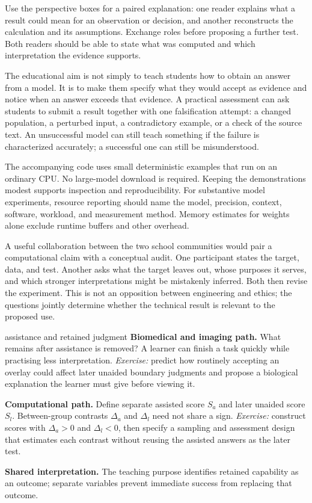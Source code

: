 \documentclass[11pt,a4paper]{article}
\begin{document}
Use the perspective boxes for a paired explanation: one reader explains what a result could mean for an observation or decision, and another reconstructs the calculation and its assumptions. Exchange roles before proposing a further test. Both readers should be able to state what was computed and which interpretation the evidence supports.

The educational aim is not simply to teach students how to obtain an answer from a model. It is to make them specify what they would accept as evidence and notice when an answer exceeds that evidence. A practical assessment can ask students to submit a result together with one falsification attempt: a changed population, a perturbed input, a contradictory example, or a check of the source text. An unsuccessful model can still teach something if the failure is characterized accurately; a successful one can still be misunderstood.

The accompanying code uses small deterministic examples that run on an ordinary CPU. No large-model download is required. Keeping the demonstrations modest supports inspection and reproducibility. For substantive model experiments, resource reporting should name the model, precision, context, software, workload, and measurement method. Memory estimates for weights alone exclude runtime buffers and other overhead.

A useful collaboration between the two school communities would pair a computational claim with a conceptual audit. One participant states the target, data, and test. Another asks what the target leaves out, whose purposes it serves, and which stronger interpretations might be mistakenly inferred. Both then revise the experiment. This is not an opposition between engineering and ethics; the questions jointly determine whether the technical result is relevant to the proposed use.

\begin{perspectives}{assistance and retained judgment}
\textbf{Biomedical and imaging path.} What remains after assistance is removed? A learner can finish a task quickly while practising less interpretation. \emph{Exercise:} predict how routinely accepting an overlay could affect later unaided boundary judgments and propose a biological explanation the learner must give before viewing it.

\textbf{Computational path.} Define separate assisted score $S_a$ and later unaided score $S_l$. Between-group contrasts $\Delta_a$ and $\Delta_l$ need not share a sign. \emph{Exercise:} construct scores with $\Delta_a>0$ and $\Delta_l<0$, then specify a sampling and assessment design that estimates each contrast without reusing the assisted answers as the later test.

\textbf{Shared interpretation.} The teaching purpose identifies retained capability as an outcome; separate variables prevent immediate success from replacing that outcome.
\end{perspectives}
\end{document}
